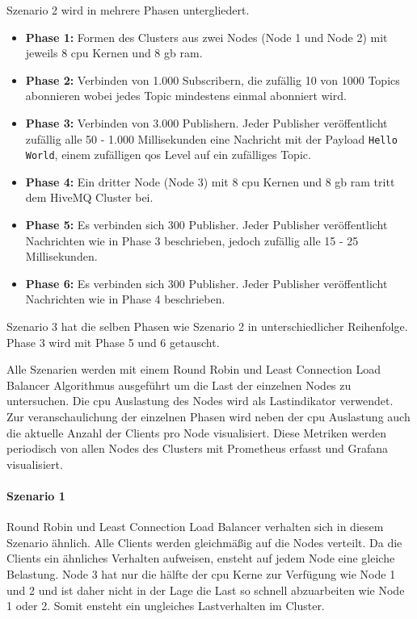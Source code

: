 Szenario 2 wird in mehrere Phasen untergliedert.
\begin{itemize}
  \item \textbf{Phase 1:} Formen des Clusters aus zwei Nodes (Node 1 und Node 2) mit jeweils 8 \ac{cpu} Kernen und 8 \ac{gb} \ac{ram}.
  \item \textbf{Phase 2:} Verbinden von 1.000 Subscribern, die zufällig 10 von 1000 Topics abonnieren wobei jedes Topic mindestens einmal abonniert wird.
  \item \textbf{Phase 3:} Verbinden von 3.000 Publishern. Jeder Publisher veröffentlicht zufällig alle 50 - 1.000 Millisekunden eine Nachricht mit der Payload \verb|Hello World|, einem zufälligen \ac{qos} Level auf ein zufälliges Topic.
  \item \textbf{Phase 4:} Ein dritter Node (Node 3) mit 8 \ac{cpu} Kernen und 8 \ac{gb} \ac{ram} tritt dem HiveMQ Cluster bei.
  \item \textbf{Phase 5:} Es verbinden sich 300 Publisher. Jeder Publisher veröffentlicht Nachrichten wie in Phase 3 beschrieben, jedoch zufällig alle 15 - 25 Millisekunden.
  \item \textbf{Phase 6:} Es verbinden sich 300 Publisher. Jeder Publisher veröffentlicht Nachrichten wie in Phase 4 beschrieben.
\end{itemize}
Szenario 3 hat die selben Phasen wie Szenario 2 in unterschiedlicher Reihenfolge. Phase 3 wird mit Phase 5 und 6 getauscht.

Alle Szenarien werden mit einem Round Robin und Least Connection Load Balancer Algorithmus ausgeführt um die Last der einzelnen Nodes zu untersuchen. Die \ac{cpu} Auslastung des Nodes wird als Lastindikator verwendet. Zur veranschaulichung der einzelnen Phasen wird neben der \ac{cpu} Auslastung auch die aktuelle Anzahl der Clients pro Node visualisiert.
Diese Metriken werden periodisch von allen Nodes des Clusters mit Prometheus erfasst und Grafana visualisiert.
\\
\paragraph{Szenario 1}
Round Robin und Least Connection Load Balancer verhalten sich in diesem Szenario ähnlich. Alle Clients werden gleichmä{\ss}ig auf die Nodes verteilt. Da die Clients ein ähnliches Verhalten aufweisen, ensteht auf jedem Node eine gleiche Belastung. Node 3 hat nur die hälfte der \ac{cpu} Kerne zur Verfügung wie Node 1 und 2 und ist daher nicht in der Lage die Last so schnell abzuarbeiten wie Node 1 oder 2. Somit ensteht ein ungleiches Lastverhalten im Cluster.

